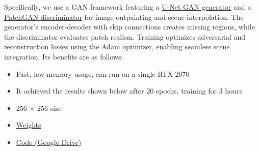 \documentclass[sigconf]{acmart}
\begin{document}
Specifically, we use a GAN framework featuring a \textcolor{red}{\href{https://paperswithcode.com/method/u-net-gan}{U-Net GAN generator}} and a \textcolor{red}{\href{https://paperswithcode.com/method/patchgan}{PatchGAN discriminator}} for image outpainting and scene interpolation. The generator’s encoder-decoder with skip connections creates missing regions, while the discriminator evaluates patch realism. Training optimizes adversarial and reconstruction losses using the Adam optimizer, enabling seamless scene integration. Its benefits are as follows:
\begin{itemize}
    \item Fast, low memory usage, can run on a single RTX 2070
    \item It achieved the results shown below after 20 epochs, training for 3 hours
    \item 256 $\times$ 256 size
    \item \textcolor{red}{\href{https://drive.google.com/file/d/1EORJGbg-rMQ_FNpzz7OSG73Vluro0Lxl/view?usp=sharing}{Weights}}
    \item \textcolor{red}{\href{https://drive.google.com/drive/u/2/folders/1wOD_tgj9k3gUZI9hBL-WtKDS-uvz9m5S}{Code (Google Drive)}}
\end{itemize}
\end{document}

